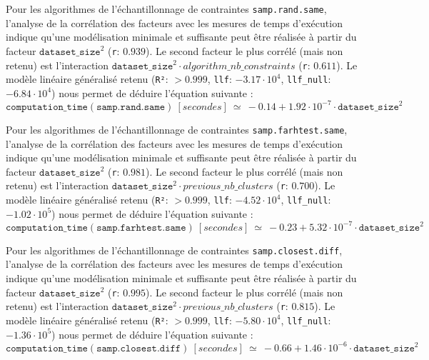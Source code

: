 			Pour les algorithmes de l'échantillonnage de contraintes \texttt{samp.rand.same}, l'analyse de la corrélation des facteurs avec les mesures de temps d'exécution indique qu'une modélisation minimale et suffisante peut être réalisée à partir du facteur $\texttt{dataset\_size}^{2}$ (\texttt{r}: $0.939$).
			Le second facteur le plus corrélé (mais non retenu) est l'interaction $\texttt{dataset\_size}^{2} \cdot algorithm\_nb\_constraints$ (\texttt{r}: $0.611$).
			Le modèle linéaire généralisé retenu (\texttt{R²}: $> 0.999$, \texttt{llf}: $-3.17 \cdot 10^{4}$, \texttt{llf\_null}: $-6.84 \cdot 10^{4}$) nous permet de déduire l'équation suivante :
			\begin{equation}
				\texttt{computation\_time}(\texttt{samp.rand.same})~[secondes]~
				\simeq~-0.14 + 1.92 \cdot 10^{-7} \cdot \texttt{dataset\_size}^{2}
			\end{equation}
			
			Pour les algorithmes de l'échantillonnage de contraintes \texttt{samp.farhtest.same}, l'analyse de la corrélation des facteurs avec les mesures de temps d'exécution indique qu'une modélisation minimale et suffisante peut être réalisée à partir du facteur $\texttt{dataset\_size}^{2}$ (\texttt{r}: $0.981$).
			Le second facteur le plus corrélé (mais non retenu) est l'interaction $\texttt{dataset\_size}^{2} \cdot previous\_nb\_clusters$ (\texttt{r}: $0.700$).
			Le modèle linéaire généralisé retenu (\texttt{R²}: $> 0.999$, \texttt{llf}: $-4.52 \cdot 10^{4}$, \texttt{llf\_null}: $-1.02 \cdot 10^{5}$) nous permet de déduire l'équation suivante :
			\begin{equation}
				\texttt{computation\_time}(\texttt{samp.farhtest.same})~[secondes]~
				\simeq~-0.23 + 5.32 \cdot 10^{-7} \cdot \texttt{dataset\_size}^{2}
			\end{equation}
			
			Pour les algorithmes de l'échantillonnage de contraintes \texttt{samp.closest.diff}, l'analyse de la corrélation des facteurs avec les mesures de temps d'exécution indique qu'une modélisation minimale et suffisante peut être réalisée à partir du facteur $\texttt{dataset\_size}^{2}$ (\texttt{r}: $0.995$).
			Le second facteur le plus corrélé (mais non retenu) est l'interaction $\texttt{dataset\_size}^{2} \cdot previous\_nb\_clusters$ (\texttt{r}: $0.815$).
			Le modèle linéaire généralisé retenu (\texttt{R²}: $> 0.999$, \texttt{llf}: $-5.80 \cdot 10^{4}$, \texttt{llf\_null}: $-1.36 \cdot 10^{5}$) nous permet de déduire l'équation suivante :
			\begin{equation}
				\texttt{computation\_time}(\texttt{samp.closest.diff})~[secondes]~
				\simeq~-0.66 + 1.46 \cdot 10^{-6} \cdot \texttt{dataset\_size}^{2}
			\end{equation}
			
